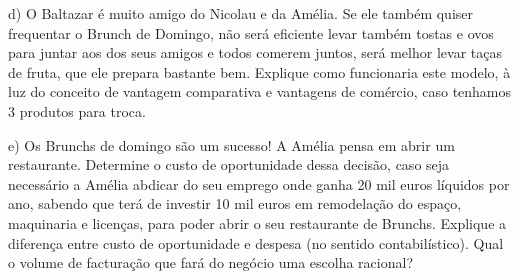 \documentclass[]{beamer}
\begin{document}
\begin{frame}
    d) O Baltazar é muito amigo do Nicolau e da Amélia. Se ele também quiser
    frequentar o Brunch de Domingo, não será eficiente levar também tostas e ovos
    para juntar aos dos seus amigos e todos comerem juntos, será melhor levar taças
    de fruta, que ele prepara bastante bem. Explique como funcionaria este modelo,
    à luz do conceito de vantagem comparativa e vantagens de comércio, caso
    tenhamos 3 produtos para troca.

    \vspace{0.25in}

\end{frame}


\begin{frame}
    e) Os Brunchs de domingo são um sucesso! A Amélia pensa em abrir um
restaurante. Determine o custo de oportunidade dessa decisão, caso seja
necessário a Amélia abdicar do seu emprego onde ganha 20 mil euros líquidos
por ano, sabendo que terá de investir 10 mil euros em remodelação do espaço,
maquinaria e licenças, para poder abrir o seu restaurante de Brunchs. Explique a
diferença entre custo de oportunidade e despesa (no sentido contabilístico).
Qual o volume de facturação que fará do negócio uma escolha racional?

\vspace{0.25in}



\end{frame}
\end{document}
